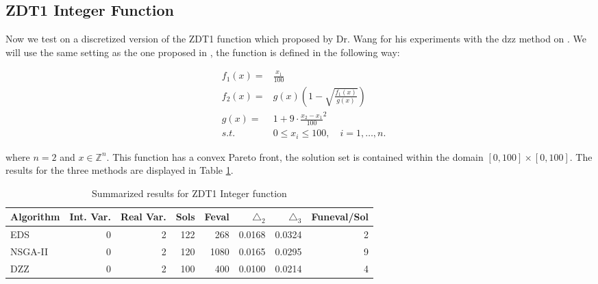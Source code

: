 \begin{comment}

 \begin{figure}[H]
   \centering
	\hspace*{-0.5in}
    \subfloat[EDS]{%
      \texttt{[image: img/fronts/pf\_dtlz1\_eds.png]}
    }
    \subfloat[NSGA-II]{%
      \texttt{[image: img/fronts/pf\_dtlz1\_ga.png]}
    }
    \caption{Pareto fronts of the DTLZ2 function computed by the different methods}
    \label{Fig:dtlz1_function_pf}
\end{figure}

\end{comment}

\subsection{ZDT1 Integer Function}

Now we test on a discretized version of the ZDT1 function which proposed by Dr. Wang for his experiments with the \gls{dzz} method on \cite{zigzag_discrete}. We will use the same setting as the one proposed in \cite{zigzag_discrete}, the function is defined in the following way:

\begin{eqnarray}
& f_1(x) = & \frac{x_1}{100} \nonumber \\
& f_2(x) = & g(x) \left(1 - \sqrt{\frac{f_1(x)}{g(x)}} \right) \\
& g(x) = & 1 + 9 \cdot \frac{x_2 - x_1}{100}^2 \nonumber \\
& s.t. & 0 \leq x_i \leq 100, \quad i = 1, \ldots, n. \nonumber
\end{eqnarray}

where $n = 2$ and $x \in \mathbb{Z}^n$. This function has a convex Pareto front, the solution set is contained within the domain $[0,100] \times [0,100]$. The results for the three methods are displayed in Table \ref{table:results_zdt1Integer_function}.

\begin{table}[!htb]
\centering
\begin{tabular}{| l  r  r  r  r  r  r  r |}
	\hline
	Algorithm & Int. Var. & Real Var. & Sols & Feval & $\triangle_2$ & $\triangle_3$ & Funeval/Sol\\  
  	\hline
  	EDS & 0 & 2  & 122 & 268 & 0.0168 & 0.0324 & 2\\
  	NSGA-II & 0 & 2 & 120 & 1080  & 0.0165 & 0.0295 & 9\\
  	DZZ & 0 & 2 & 100 & 400 & 0.0100 & 0.0214 & 4\\
  	\hline
\end{tabular}
\caption{Summarized results for ZDT1 Integer function}
\label{table:results_zdt1Integer_function}
\end{table}

